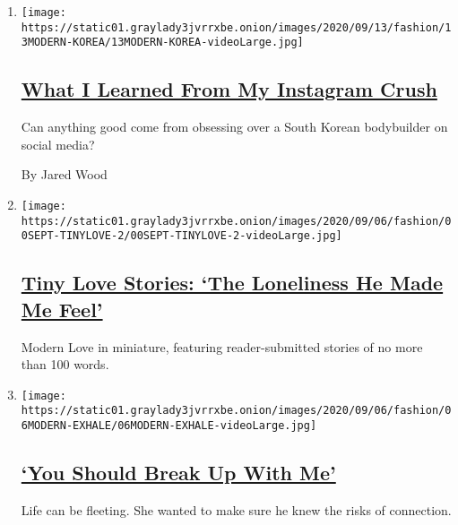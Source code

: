 \begin{enumerate}
\def\labelenumi{\arabic{enumi}.}
\item
  \texttt{[image: https://static01.graylady3jvrrxbe.onion/images/2020/09/13/fashion/13MODERN-KOREA/13MODERN-KOREA-videoLarge.jpg]}

  \hypertarget{what-i-learned-from-my-instagram-crush-1}{%
  \subsection{\texorpdfstring{\href{/2020/09/11/style/modern-love-no-emoticon-for-this-emotion.html}{What
  I Learned From My Instagram
  Crush}}{What I Learned From My Instagram Crush}}\label{what-i-learned-from-my-instagram-crush-1}}

  Can anything good come from obsessing over a South Korean bodybuilder
  on social media?

  By Jared Wood
\item
  \texttt{[image: https://static01.graylady3jvrrxbe.onion/images/2020/09/06/fashion/00SEPT-TINYLOVE-2/00SEPT-TINYLOVE-2-videoLarge.jpg]}

  \hypertarget{tiny-love-stories-the-loneliness-he-made-me-feel}{%
  \subsection{\texorpdfstring{\href{/2020/09/08/style/tiny-modern-love-stories-the-loneliness-he-made-me-feel.html}{Tiny
  Love Stories: `The Loneliness He Made Me
  Feel'}}{Tiny Love Stories: `The Loneliness He Made Me Feel'}}\label{tiny-love-stories-the-loneliness-he-made-me-feel}}

  Modern Love in miniature, featuring reader-submitted stories of no
  more than 100 words.
\item
  \texttt{[image: https://static01.graylady3jvrrxbe.onion/images/2020/09/06/fashion/06MODERN-EXHALE/06MODERN-EXHALE-videoLarge.jpg]}

  \hypertarget{you-should-break-up-with-me}{%
  \subsection{\texorpdfstring{\href{/2020/09/04/style/modern-love-widow-cancer-break-up-with-me.html}{`You
  Should Break Up With
  Me'}}{`You Should Break Up With Me'}}\label{you-should-break-up-with-me}}

  Life can be fleeting. She wanted to make sure he knew the risks of
  connection.


\end{enumerate}
